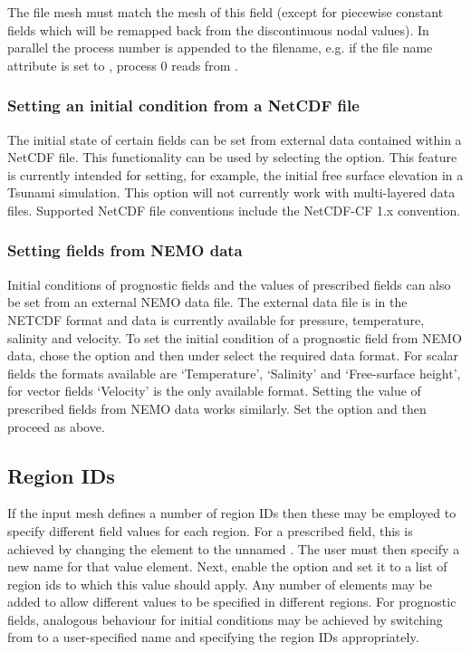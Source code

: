 The file mesh must match the mesh of this field (except for piecewise constant
fields which will be remapped back from the discontinuous nodal values). In
parallel the process number is appended to the filename, e.g. if the file name
attribute is set to , process 0 reads from .

\subsubsection{Setting an initial condition from a NetCDF file}\label{Sect:setting_from_netcdf}

The initial state of certain fields can be set from external data contained within a NetCDF file.
This functionality can be used by selecting the 
option. This feature is currently intended for setting, for example, the initial free surface elevation
in a Tsunami simulation. This option will not currently work with multi-layered data files. Supported
NetCDF file conventions include the NetCDF-CF 1.x convention.

\subsubsection{Setting fields from NEMO data}\label{Sect:setting_from_nemo}
Initial conditions of prognostic fields and the values of prescribed fields can also be set from an external NEMO
data file. The external data file is in the NETCDF format and data is currently available for pressure, temperature, salinity
and velocity. To set the initial condition of a prognostic field from NEMO data, chose the option 
 and then under  select the required data format. For scalar fields
the formats available are `Temperature', `Salinity' and `Free-surface height', for vector fields `Velocity' is the only available format.
Setting the value of prescribed fields from NEMO data works similarly. Set the option  and then proceed as above.

\subsection{Region IDs}
If the input mesh defines a number of region IDs then these may be employed
to specify different field values for each region. For a prescribed field,
this is achieved by changing the  element to
the unnamed . The user must then specify a new name for
that value element. Next, enable the  
option and set it to a list of region ids to which this value should
apply. Any number of   elements may be added to allow
different values to be specified in different regions. For prognostic
fields, analogous behaviour for initial conditions may be achieved by
switching  from  to a
user-specified name and specifying the region IDs appropriately.

